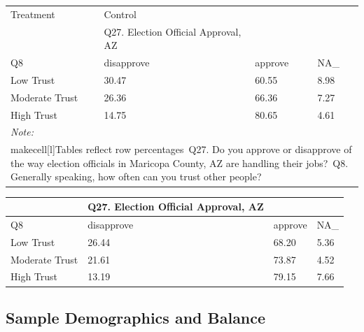 \documentclass[
  11pt,
  a4paper,
]{article}
\begin{document}
\begin{table}
\centering
\centering
\begin{tabular}[t]{l|l|l|l}
\hline
\multicolumn{1}{l|}{Treatment} & \multicolumn{1}{l}{Control} \\
\cline{1-1} \cline{2-2}
 & Q27. Election Official Approval, AZ &  & \\
\hline
Q8 & disapprove & approve & NA\_\\
\hline
Low Trust & 30.47 & 60.55 & 8.98\\
\hline
Moderate Trust & 26.36 & 66.36 & 7.27\\
\hline
High Trust & 14.75 & 80.65 & 4.61\\
\hline
\multicolumn{4}{l}{\rule{0pt}{1em}\textit{Note: }}\\
\multicolumn{4}{l}{\rule{0pt}{1em}makecell[l]{Tables reflect row percentages\ Q27. Do you approve or disapprove of the way election officials in Maricopa County, AZ are handling their jobs?\ Q8. Generally speaking, how often can you trust other people?}}\\
\end{tabular}
\centering
\begin{tabular}[t]{l|l|l|l}
\hline
 & Q27. Election Official Approval, AZ &  & \\
\hline
Q8 & disapprove & approve & NA\_\\
\hline
Low Trust & 26.44 & 68.20 & 5.36\\
\hline
Moderate Trust & 21.61 & 73.87 & 4.52\\
\hline
High Trust & 13.19 & 79.15 & 7.66\\
\hline
\end{tabular}
\end{table}

\subsection{Sample Demographics and
Balance}\label{sample-demographics-and-balance}
\end{document}
